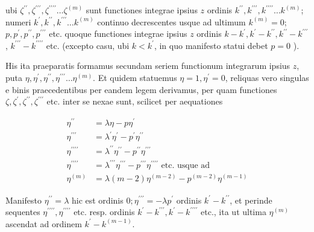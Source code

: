 \documentclass[twoside,12pt, showframe]{memoir}
\begin{document}
ubi \(\zeta^{\prime \prime}, \zeta^{\prime \prime \prime}, \zeta^{\prime \prime \prime \prime} \ldots \zeta^{(m)}\) sunt functiones integrae ipsius \(z\) ordinis \(k^{\prime \prime}, k^{\prime \prime \prime}, k^{\prime \prime \prime \prime} \ldots k^{(m)}\); numeri \(k^{\prime}, k^{\prime \prime}, k^{\prime \prime \prime} \ldots k^{(m)}\) continuo decrescentes usque ad ultimum \(k^{(m)}=0\); \(p, p^{\prime}, p^{\prime \prime}, p^{\prime \prime \prime}\) etc. quoque functiones integrae ipsius \(z\) ordinis \(k-k^{\prime}, k^{\prime}-k^{\prime \prime}, k^{\prime \prime}-k^{\prime \prime \prime}\), \(k^{\prime \prime \prime}-k^{\prime \prime \prime \prime}\) etc. (excepto casu, ubi \(k<k^{\prime}\), in quo manifesto statui debet \(p=0\) ).

His ita praeparatis formamus secundam seriem functionum integrarum ipsius \(z\), puta \(\eta, \eta^{\prime}, \eta^{\prime \prime}, \eta^{\prime \prime \prime} \ldots \eta^{(m)}\). Et quidem statuemus \(\eta=1, \eta^{\prime}=0\), reliquas vero
singulas e binis praecedentibus per eandem legem derivamus, per quam functiones \(\zeta, \zeta^{\prime}, \zeta^{\prime \prime}, \zeta^{\prime \prime \prime}\) etc. inter se nexae sunt, scilicet per aequationes

\[
\begin{aligned}
\eta^{\prime \prime} & =\lambda \eta-p \eta^{\prime} \\
\eta^{\prime \prime \prime} & =\lambda^{\prime} \eta^{\prime}-p^{\prime} \eta^{\prime \prime} \\
\eta^{\prime \prime \prime \prime} & =\lambda^{\prime \prime} \eta^{\prime \prime}-p^{\prime \prime} \eta^{\prime \prime \prime} \\
\eta^{\prime \prime \prime \prime} & =\lambda^{\prime \prime \prime} \eta^{\prime \prime \prime}-p^{\prime \prime \prime} \eta^{\prime \prime \prime \prime} \text { etc. usque ad } \\
\eta^{(m)} & =\lambda(m-2) \eta^{(m-2)}-p^{(m-2)} \eta^{(m-1)}
\end{aligned}
\]

Manifesto \(\eta^{\prime \prime}=\lambda\) hic est ordinis \(0 ; \eta^{\prime \prime \prime}=-\lambda p^{\prime}\) ordinis \(k^{\prime}-k^{\prime \prime}\), et perinde sequentes \(\eta^{\prime \prime \prime \prime}, \eta^{\prime \prime \prime \prime}\) etc. resp. ordinis \(k^{\prime}-k^{\prime \prime \prime}, k^{\prime}-k^{\prime \prime \prime \prime}\) etc., ita ut ultima \(\eta^{(m)}\) ascendat ad ordinem \(k^{\prime}-k^{(m-1)}\).
\end{document}
